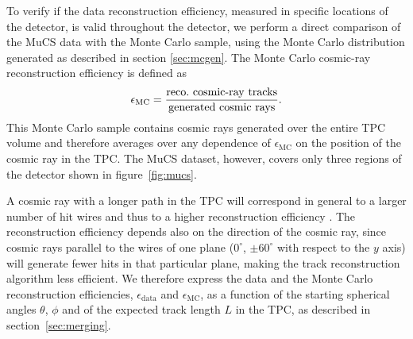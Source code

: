 \documentclass[a4paper,11pt]{article}
\def\myhyphen{{\hbox{-}}}
\begin{document}


To verify if the data reconstruction efficiency, measured in specific locations of the detector, is valid throughout the detector, we perform a direct comparison of the MuCS data with the Monte Carlo sample, using the Monte Carlo distribution generated as described in section \ref{sec:mcgen}.
The Monte Carlo cosmic-ray reconstruction efficiency is defined as
\begin{equation}
  \epsilon_{\mathrm{MC}} = \frac{\mathrm{reco.~cosmic\myhyphen ray~tracks}}{\mathrm{generated~cosmic~rays}}.
\end{equation}
This Monte Carlo sample contains cosmic rays generated over the entire TPC volume and therefore averages over any dependence of $\epsilon_{\mathrm{MC}}$ on the position of the cosmic ray in the TPC. The MuCS dataset, however, covers only three regions of the detector shown in figure~\ref{fig:mucs}. %

A cosmic ray with a longer path in the TPC will correspond in general to a larger number of hit wires and thus to a higher reconstruction efficiency \cite{pandora2}. The reconstruction efficiency depends also on the direction of the cosmic ray, since cosmic rays parallel to the wires of one plane ($0^{\circ}$, $\pm60^{\circ}$ with respect to the $y$ axis) will generate fewer hits in that particular plane, making the track reconstruction algorithm less efficient.
We therefore express the data and the Monte Carlo reconstruction efficiencies, $\epsilon_{\mathrm{data}}$ and $\epsilon_{\mathrm{MC}}$, as a function of the starting spherical angles $\theta$, $\phi$ and of the expected track length $L$ in the TPC, as described in section~\ref{sec:merging}.
\end{document}
